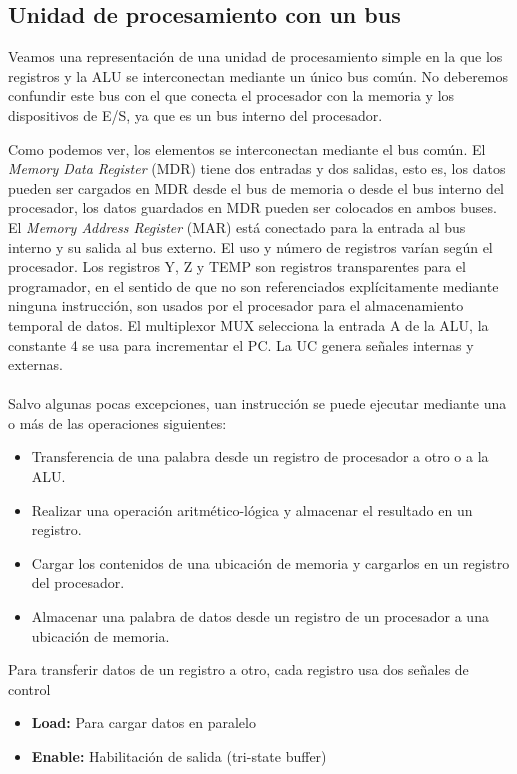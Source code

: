 \subsection{Unidad de procesamiento con un bus}
Veamos una representación de una unidad de procesamiento simple en la que los registros y la ALU se interconectan mediante un único bus común. No deberemos confundir este bus con
el que conecta el procesador con la memoria y los dispositivos de E/S, ya que es un bus interno del procesador.
\begin{center}
    
\end{center}
Como podemos ver, los elementos se interconectan mediante el bus común. El 
\textit{Memory Data Register} (MDR) tiene dos entradas y dos salidas, esto es,
los datos pueden ser cargados en MDR desde el bus de memoria o desde el bus interno del 
procesador, los datos guardados en MDR pueden ser colocados en ambos buses. El
\textit{Memory Address Register} (MAR) está conectado para la entrada al bus interno y su salida al bus externo.
El uso y número de registros varían según el procesador. Los registros 
Y, Z y TEMP son registros transparentes para el programador, en el sentido de 
que no son referenciados explícitamente mediante ninguna instrucción, son usados por el procesador 
para el almacenamiento temporal de datos.
El multiplexor MUX selecciona la entrada A de la ALU, la constante 4 se usa para incrementar el PC.
La UC genera señales internas y externas.
\\ \\ Salvo algunas pocas excepciones, uan instrucción se puede ejecutar mediante una o más de las operaciones siguientes:
\begin{itemize}
    \item Transferencia de una palabra desde un registro de procesador a otro o a la ALU.
    \item Realizar una operación aritmético-lógica y almacenar el resultado en un registro.
    \item Cargar los contenidos de una ubicación de memoria y cargarlos en un registro del procesador.
    \item Almacenar una palabra de datos desde un registro de un procesador a una ubicación de memoria.
\end{itemize}
Para transferir datos de un registro a otro, cada registro usa dos señales de control
\begin{itemize}
    \item \textbf{Load:} Para cargar datos en paralelo
    \item \textbf{Enable:} Habilitación de salida (tri-state buffer)
\end{itemize}
